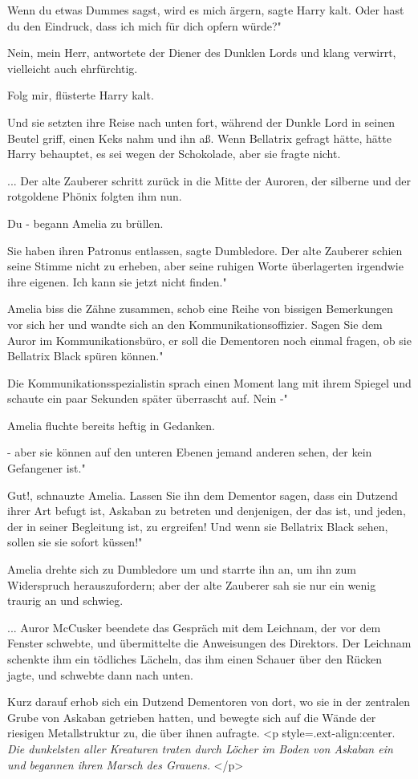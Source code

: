\glqq Wenn du etwas Dummes sagst, wird es mich ärgern\grqq{}, sagte Harry kalt.
\glqq Oder hast du den Eindruck, dass ich mich für dich opfern würde?"

\glqq Nein, mein Herr\grqq{}, antwortete der Diener des Dunklen Lords und klang
verwirrt, vielleicht auch ehrfürchtig.

\glqq Folg mir\grqq{}, flüsterte Harry kalt.

Und sie setzten ihre Reise nach unten fort, während der Dunkle Lord in seinen
Beutel griff, einen Keks nahm und ihn aß. Wenn Bellatrix gefragt hätte, hätte
Harry behauptet, es sei wegen der Schokolade, aber sie fragte nicht.


... Der alte Zauberer schritt zurück in die Mitte der Auroren, der silberne und
der rotgoldene Phönix folgten ihm nun.

\glqq Du -\grqq{} begann Amelia zu brüllen.

\glqq Sie haben ihren Patronus entlassen\grqq{}, sagte Dumbledore. Der alte
Zauberer schien seine Stimme nicht zu erheben, aber seine ruhigen Worte
überlagerten irgendwie ihre eigenen. \glqq Ich kann sie jetzt nicht finden."

Amelia biss die Zähne zusammen, schob eine Reihe von bissigen Bemerkungen vor
sich her und wandte sich an den Kommunikationsoffizier. \glqq Sagen Sie dem
Auror im Kommunikationsbüro, er soll die Dementoren noch einmal fragen, ob sie
Bellatrix Black spüren können."

Die Kommunikationsspezialistin sprach einen Moment lang mit ihrem Spiegel und
schaute ein paar Sekunden später überrascht auf. \glqq Nein -"

Amelia fluchte bereits heftig in Gedanken.

\glqq - aber sie können auf den unteren Ebenen jemand anderen sehen, der kein
Gefangener ist."

\glqq Gut!\grqq{}, schnauzte Amelia. \glqq Lassen Sie ihn dem Dementor sagen,
dass ein Dutzend ihrer Art befugt ist, Askaban zu betreten und denjenigen, der
das ist, und jeden, der in seiner Begleitung ist, zu ergreifen! Und wenn sie
Bellatrix Black sehen, sollen sie sie sofort küssen!"

Amelia drehte sich zu Dumbledore um und starrte ihn an, um ihn zum Widerspruch
herauszufordern; aber der alte Zauberer sah sie nur ein wenig traurig an und
schwieg.


... Auror McCusker beendete das Gespräch mit dem Leichnam, der vor dem Fenster
schwebte, und übermittelte die Anweisungen des Direktors. Der Leichnam schenkte
ihm ein tödliches Lächeln, das ihm einen Schauer über den Rücken jagte, und
schwebte dann nach unten.

Kurz darauf erhob sich ein Dutzend Dementoren von dort, wo sie in der zentralen
Grube von Askaban getrieben hatten, und bewegte sich auf die Wände der riesigen
Metallstruktur zu, die über ihnen aufragte. <p
style=\grqq{}.ext-align:center\grqq{}. \emph{ Die dunkelsten aller Kreaturen
traten durch Löcher im Boden von Askaban ein und begannen ihren Marsch des
Grauens. }</p>

